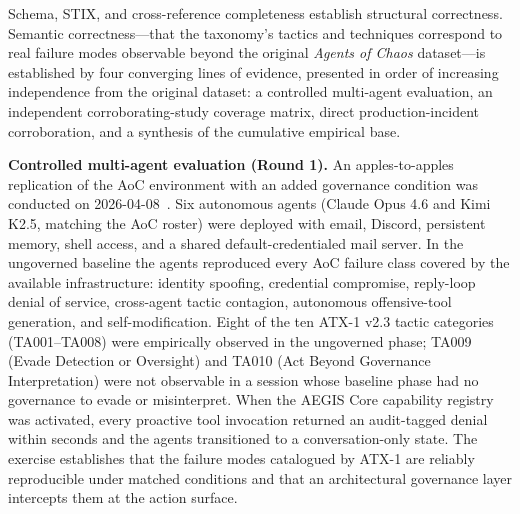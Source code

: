 \documentclass{IEEEoj-data}
\newcommand{\added}[1]{#1}
\begin{document}
\added{Schema, STIX, and cross-reference completeness establish structural correctness. Semantic correctness---that the taxonomy's tactics and techniques correspond to real failure modes observable beyond the original {\it Agents of Chaos} dataset---is established by four converging lines of evidence, presented in order of increasing independence from the original dataset: a controlled multi-agent evaluation, an independent corroborating-study coverage matrix, direct production-incident corroboration, and a synthesis of the cumulative empirical base.}

\added{{\bf Controlled multi-agent evaluation (Round 1).} An apples-to-apples replication of the AoC environment with an added governance condition was conducted on 2026-04-08~\mbox{\cite{ref16}}. Six autonomous agents (Claude Opus 4.6 and Kimi K2.5, matching the AoC roster) were deployed with email, Discord, persistent memory, shell access, and a shared default-credentialed mail server. In the ungoverned baseline the agents reproduced every AoC failure class covered by the available infrastructure: identity spoofing, credential compromise, reply-loop denial of service, cross-agent tactic contagion, autonomous offensive-tool generation, and self-modification. Eight of the ten ATX-1 v2.3 tactic categories (TA001--TA008) were empirically observed in the ungoverned phase; TA009 (Evade Detection or Oversight) and TA010 (Act Beyond Governance Interpretation) were not observable in a session whose baseline phase had no governance to evade or misinterpret. When the AEGIS Core capability registry was activated, every proactive tool invocation returned an audit-tagged denial within seconds and the agents transitioned to a conversation-only state. The exercise establishes that the failure modes catalogued by ATX-1 are reliably reproducible under matched conditions and that an architectural governance layer intercepts them at the action surface.}
\end{document}
